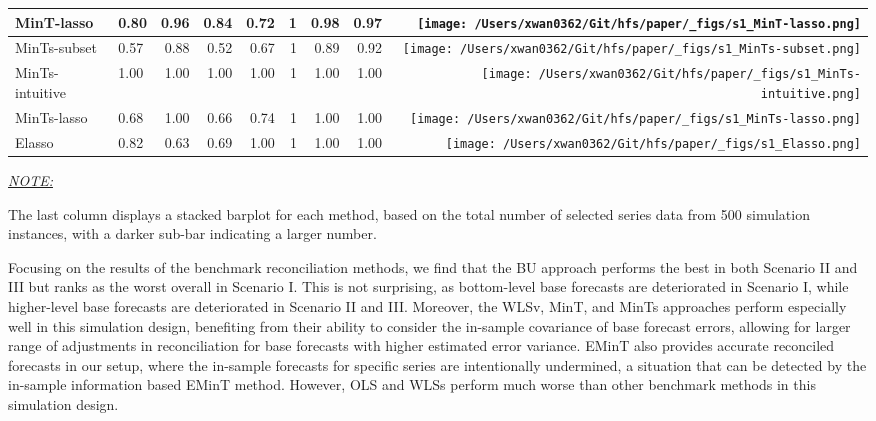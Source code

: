 \documentclass[11pt,a4paper,]{article}
\begin{document}
\begin{table}[!h]
{\begin{threeparttable}
\begin{tabular}{llrrrrrr>{}r}
MinT-lasso & 0.80 & 0.96 & 0.84 & 0.72 & 1 & 0.98 & 0.97 & \texttt{[image: /Users/xwan0362/Git/hfs/paper/\_figs/s1\_MinT-lasso.png]}\\
\midrule
MinTs-subset & 0.57 & 0.88 & 0.52 & 0.67 & 1 & 0.89 & 0.92 & \texttt{[image: /Users/xwan0362/Git/hfs/paper/\_figs/s1\_MinTs-subset.png]}\\
MinTs-intuitive & 1.00 & 1.00 & 1.00 & 1.00 & 1 & 1.00 & 1.00 & \texttt{[image: /Users/xwan0362/Git/hfs/paper/\_figs/s1\_MinTs-intuitive.png]}\\
MinTs-lasso & 0.68 & 1.00 & 0.66 & 0.74 & 1 & 1.00 & 1.00 & \texttt{[image: /Users/xwan0362/Git/hfs/paper/\_figs/s1\_MinTs-lasso.png]}\\
\midrule
Elasso & 0.82 & 0.63 & 0.69 & 1.00 & 1 & 1.00 & 1.00 & \texttt{[image: /Users/xwan0362/Git/hfs/paper/\_figs/s1\_Elasso.png]}\\
\bottomrule
\end{tabular}
\begin{tablenotes}[para]
\item \underline{\textit{NOTE:}} 
\item The last column displays a stacked barplot for each method, based on the total number of selected series data from 500 simulation instances, with a darker sub-bar indicating a larger number.
\end{tablenotes}
\end{threeparttable}}
\endgroup{}
\end{table}

Focusing on the results of the benchmark reconciliation methods, we find
that the BU approach performs the best in both Scenario II and III but
ranks as the worst overall in Scenario I. This is not surprising, as
bottom-level base forecasts are deteriorated in Scenario I, while
higher-level base forecasts are deteriorated in Scenario II and III.
Moreover, the WLSv, MinT, and MinTs approaches perform especially well
in this simulation design, benefiting from their ability to consider the
in-sample covariance of base forecast errors, allowing for larger range
of adjustments in reconciliation for base forecasts with higher
estimated error variance. EMinT also provides accurate reconciled
forecasts in our setup, where the in-sample forecasts for specific
series are intentionally undermined, a situation that can be detected by
the in-sample information based EMinT method. However, OLS and WLSs
perform much worse than other benchmark methods in this simulation
design.
\end{document}
